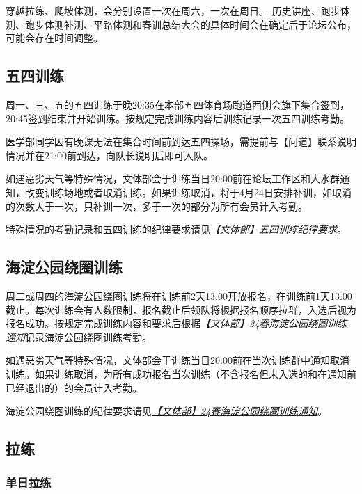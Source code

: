 \documentclass[UTF8]{ctexart}
\begin{document}
\begin{table}[h]
{\begin{tabular}
    \end{tabular}%
    }
\end{table}

穿越拉练、爬坡体测，会分别设置一次在周六，一次在周日。
历史讲座、跑步体测、跑步体测补测、平路体测和春训总结大会的具体时间会在确定后于论坛公布，可能会存在时间调整。

\subsection{五四训练}

周一、三、五的五四训练于晚20:35在本部五四体育场跑道西侧会旗下集合签到，20:45签到结束并开始训练。按规定完成训练内容后训练记录一次五四训练考勤。

医学部同学因有晚课无法在集合时间前到达五四操场，需提前与【问道】联系说明情况并在21:00前到达，向队长说明后即可入队。

如遇恶劣天气等特殊情况，文体部会于训练当日20:00前在论坛工作区和大水群通知，改变训练场地或者取消训练。如果训练取消，将于4月24日安排补训，如取消的次数大于一次，只补训一次，多于一次的部分为所有会员计入考勤。

特殊情况的考勤记录和五四训练的纪律要求请见\href{https://chexie.net/bbs/content/index.php?bid=1\&tid=9576\&p=1}{\textit{【文体部】五四训练纪律要求}}。


\subsection{海淀公园绕圈训练}

周二或周四的海淀公园绕圈训练将在训练前2天13:00开放报名，在训练前1天13:00截止。每次训练会有人数限制，报名截止后领队将根据报名顺序拉群，入选后视为报名成功。按规定完成训练内容和要求后根据\href{https://chexie.net/bbs/content/?bid=1&tid=9743&p=1}{\textit{【文体部】24春海淀公园绕圈训练通知}}记录海淀公园绕圈训练考勤。

如遇恶劣天气等特殊情况，文体部会于训练当日20:00前在当次训练群中通知取消训练。如果训练取消，为所有成功报名当次训练（不含报名但未入选的和在通知前已经退出的）的会员计入考勤。

海淀公园绕圈训练的纪律要求请见\href{https://chexie.net/bbs/content/?bid=1&tid=9743&p=1}{\textit{【文体部】24春海淀公园绕圈训练通知}}。

\subsection{拉练}

\subsubsection{单日拉练}
\end{document}
